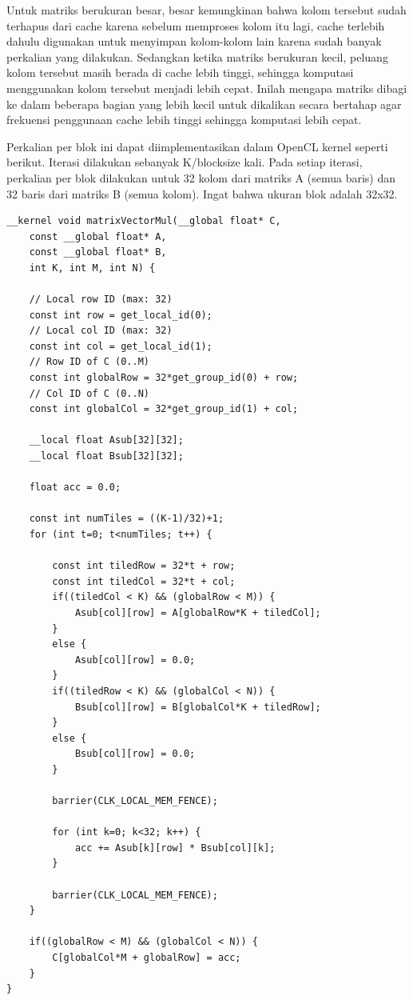 Untuk matriks berukuran besar, besar kemungkinan bahwa kolom tersebut sudah terhapus dari cache karena sebelum memproses kolom itu lagi, cache terlebih dahulu digunakan untuk menyimpan kolom-kolom lain karena sudah banyak perkalian yang dilakukan. Sedangkan ketika matriks berukuran kecil, peluang kolom tersebut masih berada di cache lebih tinggi, sehingga komputasi menggunakan kolom tersebut menjadi lebih cepat. Inilah mengapa matriks dibagi ke dalam beberapa bagian yang lebih kecil untuk dikalikan secara bertahap agar frekuensi penggunaan cache lebih tinggi sehingga komputasi lebih cepat. 

Perkalian per blok ini dapat diimplementasikan dalam OpenCL kernel seperti berikut. Iterasi dilakukan sebanyak K/blocksize kali. Pada setiap iterasi, perkalian per blok dilakukan untuk 32 kolom dari matriks A (semua baris) dan 32 baris dari matriks B (semua kolom). Ingat bahwa ukuran blok adalah 32x32.

\begin{lstlisting}[frame=single]
__kernel void matrixVectorMul(__global float* C, 
    const __global float* A, 
    const __global float* B, 
    int K, int M, int N) { 

	// Local row ID (max: 32)
    const int row = get_local_id(0);
    // Local col ID (max: 32)  
    const int col = get_local_id(1);
    // Row ID of C (0..M)  
    const int globalRow = 32*get_group_id(0) + row; 
    // Col ID of C (0..N) 
    const int globalCol = 32*get_group_id(1) + col;  

    __local float Asub[32][32]; 
    __local float Bsub[32][32]; 

    float acc = 0.0; 

    const int numTiles = ((K-1)/32)+1; 
    for (int t=0; t<numTiles; t++) { 

        const int tiledRow = 32*t + row; 
        const int tiledCol = 32*t + col; 
        if((tiledCol < K) && (globalRow < M)) {
            Asub[col][row] = A[globalRow*K + tiledCol]; 
        }  
        else {   
            Asub[col][row] = 0.0; 
        }  
        if((tiledRow < K) && (globalCol < N)) {
            Bsub[col][row] = B[globalCol*K + tiledRow]; 
        }  
        else {   
            Bsub[col][row] = 0.0; 
        }  

        barrier(CLK_LOCAL_MEM_FENCE); 

        for (int k=0; k<32; k++) { 
            acc += Asub[k][row] * Bsub[col][k]; 
        } 

        barrier(CLK_LOCAL_MEM_FENCE); 
    } 

    if((globalRow < M) && (globalCol < N)) { 
        C[globalCol*M + globalRow] = acc; 
    }
}
\end{lstlisting}

